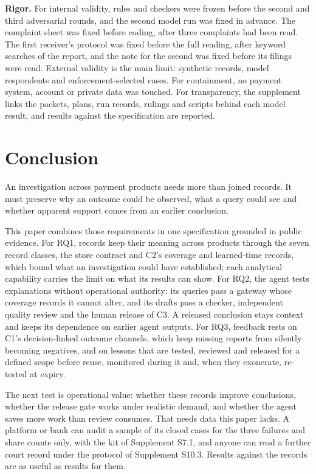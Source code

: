 \documentclass[acmlarge,review,anonymous,nonacm]{acmart}
\begin{document}
\textbf{Rigor.} For internal validity, rules and checkers were frozen
before the second and third adversarial rounds, and the second model run
was fixed in advance. The complaint sheet was fixed before coding, after
three complaints had been read. The first receiver's protocol was fixed
before the full reading, after keyword searches of the report, and the
note for the second was fixed before its filings were read. External
validity is the main limit: synthetic records, model respondents and
enforcement-selected cases. For containment, no payment system, account
or private data was touched. For transparency, the supplement links the
packets, plans, run records, rulings and scripts behind each model
result, and results against the specification are reported.

\hypertarget{conclusion}{%
\section{Conclusion}\label{conclusion}}

An investigation across payment products needs more than joined records.
It must preserve why an outcome could be observed, what a query could
see and whether apparent support comes from an earlier conclusion.

This paper combines those requirements in one specification grounded in
public evidence. For RQ1, records keep their meaning across products
through the seven record classes, the store contract and C2's coverage
and learned-time records, which bound what an investigation could have
established; each analytical capability carries the limit on what its
results can show. For RQ2, the agent tests explanations without
operational authority: its queries pass a gateway whose coverage records
it cannot alter, and its drafts pass a checker, independent quality
review and the human release of C3. A released conclusion stays context
and keeps its dependence on earlier agent outputs. For RQ3, feedback
rests on C1's decision-linked outcome channels, which keep missing
reports from silently becoming negatives, and on lessons that are
tested, reviewed and released for a defined scope before reuse,
monitored during it and, when they exonerate, re-tested at expiry.

The next test is operational value: whether these records improve
conclusions, whether the release gate works under realistic demand, and
whether the agent saves more work than review consumes. That needs data
this paper lacks. A platform or bank can audit a sample of its closed
cases for the three failures and share counts only, with the kit of
Supplement S7.1, and anyone can read a further court record under the
protocol of Supplement S10.3. Results against the records are as useful
as results for them.
\end{document}
